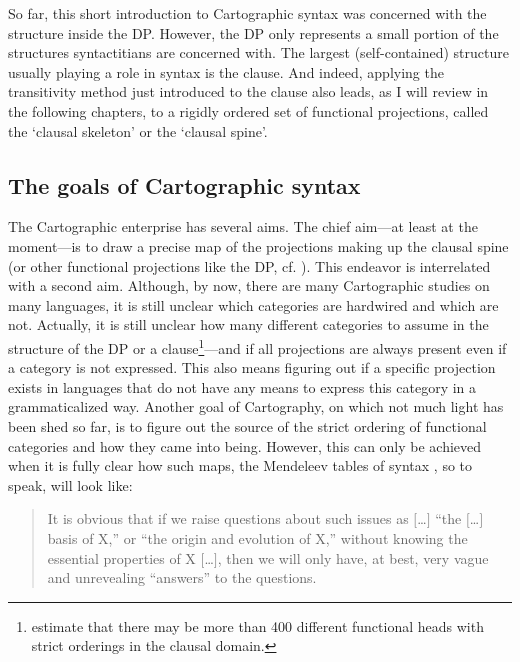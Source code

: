 So far, this short introduction to Cartographic syntax was concerned with the structure inside the DP. However, the DP only represents a small portion of the structures syntactitians are concerned with. The largest (self-contained) structure usually playing a role in syntax is the clause. And indeed, applying the transitivity method just introduced to the clause also leads, as I will review in the following chapters, to a rigidly ordered set of functional projections, called the `clausal skeleton' or the `clausal spine'. 

\subsection{The goals of Cartographic syntax}


The Cartographic enterprise has several aims. The chief aim---at least at the moment---is to draw a precise map of the projections making up the clausal spine (or other functional projections like the DP, cf. \citealt[3]{cinque2006restructuring}). This endeavor is interrelated with a second aim. Although, by now, there are many Cartographic studies on many languages, it is still unclear which categories are hardwired and which are not. Actually, it is still unclear how many different categories to assume in the structure of the DP or a clause\footnote{ \citep{cinque2010mapping} estimate that there may be more than 400 different functional heads with strict orderings in the clausal domain.}---and if all projections are always present even if a category is not expressed. This also means figuring out if a specific projection exists in languages that do not have any means to express this category in a grammaticalized way. Another goal of Cartography, on which not much light has been shed so far, is to figure out the source of the strict ordering of functional categories and how they came into being. However, this can only be achieved when it is fully clear how such maps, the Mendeleev tables of syntax \citep[199]{rizzi2013notes}, so to speak, will look like:

\begin{quote}
It is obvious that if we raise questions about such issues as $[$\dots $]$ ``the $[$\dots $]$ basis of X,'' or ``the origin and evolution of X,'' without knowing the essential properties of X $[$\dots $]$, then we will only have, at best, very vague and unrevealing ``answers'' to the questions. \citep[8]{fukui2004tro}
\end{quote}

